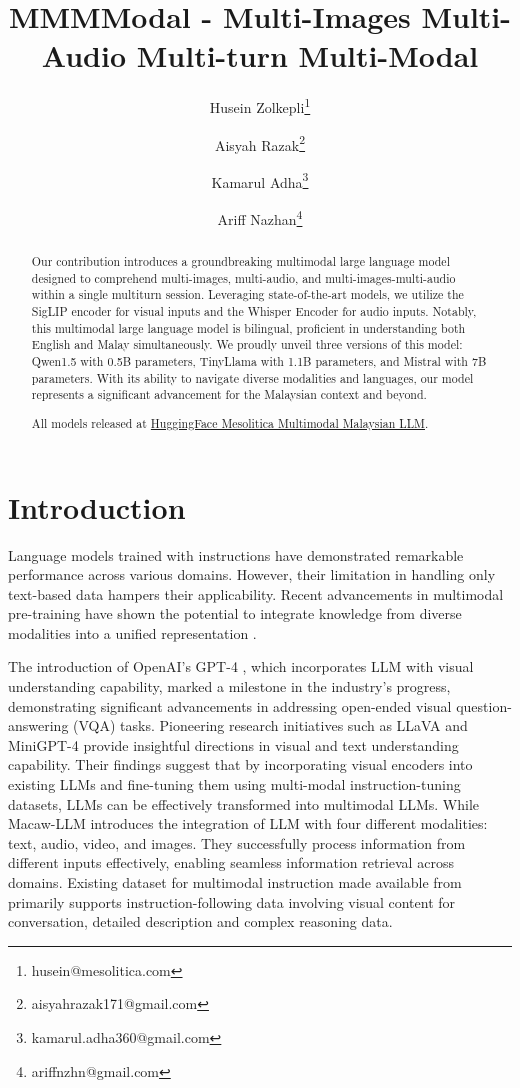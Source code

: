 \documentclass[preprint]{article}
\title{MMMModal - Multi-Images Multi-Audio Multi-turn Multi-Modal}
\author{
  Husein Zolkepli\thanks{husein@mesolitica.com} \and
  Aisyah Razak\thanks{aisyahrazak171@gmail.com} \and
  Kamarul Adha\thanks{kamarul.adha360@gmail.com} \and
  Ariff Nazhan\thanks{ariffnzhn@gmail.com}
}
\begin{document}
\maketitle

\begin{abstract}

  Our contribution introduces a groundbreaking multimodal large language model designed to comprehend multi-images, multi-audio, and multi-images-multi-audio within a single multiturn session. Leveraging state-of-the-art models, we utilize the SigLIP encoder for visual inputs and the Whisper Encoder for audio inputs. Notably, this multimodal large language model is bilingual, proficient in understanding both English and Malay simultaneously. We proudly unveil three versions of this model: Qwen1.5 with 0.5B parameters, TinyLlama with 1.1B parameters, and Mistral with 7B parameters. With its ability to navigate diverse modalities and languages, our model represents a significant advancement for the Malaysian context and beyond.

  All models released at \href{https://huggingface.co/collections/mesolitica/multimodal-malaysian-llm-65c6f893e03f78fa9e5c8859}{HuggingFace Mesolitica Multimodal Malaysian LLM}.

\end{abstract}

\section{Introduction}


Language models trained with instructions have demonstrated remarkable performance across various domains. However, their limitation in handling only text-based data hampers their applicability. Recent advancements in multimodal pre-training have shown the potential to integrate knowledge from diverse modalities into a unified representation \cite{lyu2023macawllm,liu2023visual,openai2023gpt4}.

The introduction of OpenAI's GPT-4 \cite{openai2023gpt4}, which incorporates LLM with visual understanding capability, marked a milestone in the industry's progress, demonstrating significant advancements in addressing open-ended visual question-answering (VQA) tasks. Pioneering research initiatives such as LLaVA \cite{liu2023visual} and MiniGPT-4 \cite{zhu2023minigpt4} provide insightful directions in visual and text understanding capability. Their findings suggest that by incorporating visual encoders into existing LLMs and fine-tuning them using multi-modal instruction-tuning datasets, LLMs can be effectively transformed into multimodal LLMs. While Macaw-LLM \cite{lyu2023macawllm} introduces the integration of LLM with four different modalities: text, audio, video, and images. They successfully process information from different inputs effectively, enabling seamless information retrieval across domains. Existing dataset for multimodal instruction made available from \cite{liu2023visual} primarily supports instruction-following data involving visual content for conversation, detailed description and complex reasoning data.
\end{document}
